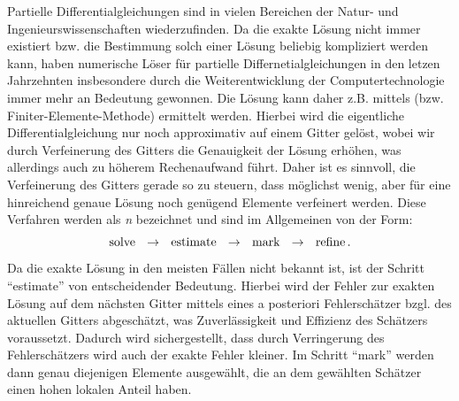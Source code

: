 \label{kap:1}


Partielle Differentialgleichungen sind in vielen Bereichen der Natur- und Ingenieurswissenschaften wiederzufinden. Da die exakte Lösung nicht immer existiert bzw. die Bestimmung solch einer Lösung beliebig kompliziert werden kann, haben numerische Löser für partielle Differnetialgleichungen in den letzen Jahrzehnten insbesondere durch die Weiterentwicklung der Computertechnologie immer mehr an Bedeutung gewonnen. Die Lösung kann daher z.B. mittels  (bzw. Finiter-Elemente-Methode) ermittelt werden. Hierbei wird die eigentliche Differentialgleichung nur noch approximativ auf einem Gitter gelöst, wobei wir durch Verfeinerung des Gitters die Genauigkeit der Lösung erhöhen, was allerdings auch zu höherem Rechenaufwand führt. Daher ist es sinnvoll, die Verfeinerung des Gitters gerade so zu steuern, dass möglichst wenig, aber für eine hinreichend genaue Lösung noch genügend Elemente verfeinert werden. Diese Verfahren werden als \textit{n} bezeichnet und sind im Allgemeinen von der Form:
\[
	\text{solve}\ \ \ra \ \ \text{estimate}\ \ \ra\ \ \text{mark}\ \ \ra\  \ \text{refine} \, .
\]
Da die exakte Lösung in den meisten Fällen nicht bekannt ist, ist der Schritt "`estimate"' von entscheidender Bedeutung. Hierbei wird der Fehler zur exakten Lösung auf dem nächsten Gitter mittels eines a posteriori Fehlerschätzer bzgl. des aktuellen Gitters abgeschätzt, was Zuverlässigkeit und Effizienz des Schätzers voraussetzt. Dadurch wird sichergestellt, dass durch Verringerung des Fehlerschätzers wird auch der exakte Fehler kleiner. Im Schritt "`mark"' werden dann genau diejenigen Elemente ausgewählt, die an dem gewählten Schätzer einen hohen lokalen Anteil haben.

